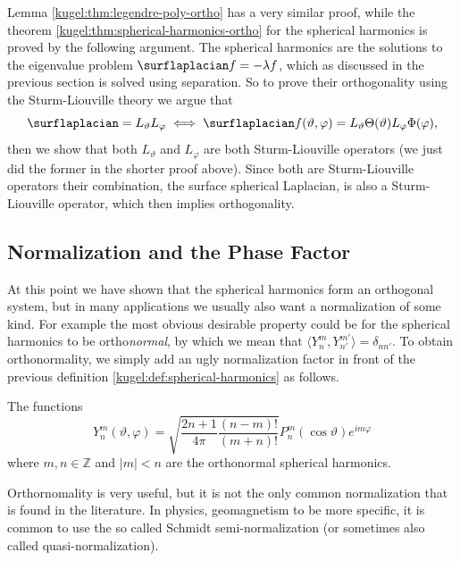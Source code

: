 Lemma \ref{kugel:thm:legendre-poly-ortho} has a very similar
proof, while the theorem \ref{kugel:thm:spherical-harmonics-ortho} for the
spherical harmonics is proved by the following argument. The spherical harmonics
are the solutions to the eigenvalue problem $\surflaplacian f = -\lambda f$,
which as discussed in the previous section is solved using separation. So to
prove their orthogonality using the Sturm-Liouville theory we argue that
\begin{equation*}
  \surflaplacian = L_\vartheta L_\varphi \iff
  \surflaplacian f(\vartheta, \varphi)
    = L_\vartheta \Theta(\vartheta) L_\varphi \Phi(\varphi),
\end{equation*}
then we show that both $L_\vartheta$ and $L_\varphi$ are both Sturm-Liouville
operators (we just did the former in the shorter proof above). Since both are
Sturm-Liouville operators their combination, the surface spherical Laplacian, is
also a Sturm-Liouville operator, which then implies orthogonality.

\subsection{Normalization and the Phase Factor}

At this point we have shown that the spherical harmonics form an orthogonal
system, but in many applications we usually also want a normalization of some
kind. For example the most obvious desirable property could be for the spherical
harmonics to be ortho\emph{normal}, by which we mean that $\langle Y^m_n,
Y^{m'}_{n'} \rangle = \delta_{nn'}$. To obtain orthonormality, we simply add an
ugly normalization factor in front of the previous definition
\ref{kugel:def:spherical-harmonics} as follows.

\begin{definition}
  \label{kugel:def:spherical-harmonics-orthonormal}
  The functions
  \begin{equation*}
    Y^m_n(\vartheta, \varphi)
    = \sqrt{\frac{2n + 1}{4\pi} \frac{(n-m)!}{(m+n)!}}
      P^m_n(\cos \vartheta) e^{im\varphi}
  \end{equation*}
  where $m, n \in \mathbb{Z}$ and $|m| < n$ are the orthonormal spherical
  harmonics.
\end{definition}

Orthornomality is very useful, but it is not the only common normalization that
is found in the literature. In physics, geomagnetism to be more specific, it is
common to use the so called Schmidt semi-normalization (or sometimes also called
quasi-normalization).

